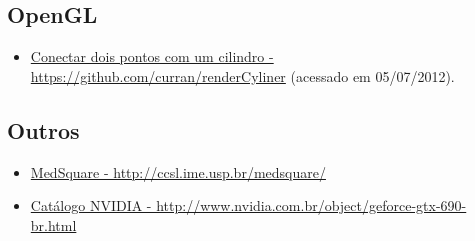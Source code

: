 \subsection{OpenGL}
\begin{itemize}
  \item \href{https://github.com/curran/renderCyliner}{Conectar dois pontos com um cilindro - https://github.com/curran/renderCyliner} (acessado em 05/07/2012).
\end{itemize}

\subsection{Outros}
\begin{itemize}
  \item \label{medsquare}\href{http://ccsl.ime.usp.br/medsquare/}{MedSquare - http://ccsl.ime.usp.br/medsquare/}
  \item \label{gtx690}\href{http://www.nvidia.com.br/object/geforce-gtx-690-br.html}{Catálogo NVIDIA - http://www.nvidia.com.br/object/geforce-gtx-690-br.html}
\end{itemize}

